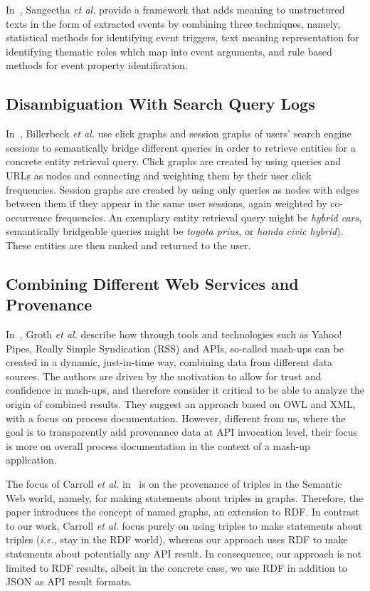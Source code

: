 \documentclass[twocolumn]{article}
\begin{document}
In~\cite{Sangeetha}, Sangeetha \emph{et al.} provide a framework that adds meaning to unstructured texts in the form of extracted events by combining three techniques, 
namely, statistical methods for identifying event triggers, 
text meaning representation for identifying thematic 
roles which map into event arguments, and rule based 
methods for event property identification.

\subsection{Disambiguation With Search Query Logs}
In~\cite{Billerbeck:QueryLogs}, Billerbeck \emph{et al.} use click graphs and session graphs of users' search engine sessions
to semantically bridge different queries in order to retrieve entities for a concrete entity retrieval query. Click
graphs are created by using queries and URLs as nodes and connecting and weighting them by their user click
frequencies. Session graphs are created by using only queries as nodes with edges between them if they appear in the same user
sessions, again weighted by co-occurrence frequencies. An exemplary entity retrieval query might be \textit{hybrid
cars}, semantically bridgeable queries might be \textit{toyota prius}, or \textit{honda civic hybrid}). These entities
are then ranked and returned to the user.

\subsection{Combining Different Web Services and Provenance}
In~\cite{Groth:2009:MPD:1462159.1462162}, Groth \emph{et al.} describe how through tools and technologies such as Yahoo! Pipes, Really Simple Syndication (RSS) and APIs, so-called mash-ups can be created in a dynamic, just-in-time way, combining data from different data sources. The authors are driven by the motivation to allow for trust and confidence in mash-ups, and therefore consider it critical to be able to analyze the origin of combined results. They suggest an approach based on OWL and XML, with a focus on process documentation. However, different from us, where the goal is to transparently add provenance data at API invocation level, their focus is more on overall process documentation in the context of a mash-up application.

The focus of Carroll \emph{et al.} in~\cite{carroll2005} is on the provenance of triples in the Semantic Web world, namely, for making statements about triples in graphs. Therefore, the paper introduces the concept of named graphs, an extension to RDF. In contrast to our work, Carroll \emph{et al.} focus purely on using triples to make statements about triples (\emph{i.e.}, stay in the RDF world), whereas our approach uses RDF to make statements about potentially any API result. In consequence, our approach is not limited to RDF results, albeit in the concrete case, we use RDF in addition to JSON as API result formats.
 
\end{document}
